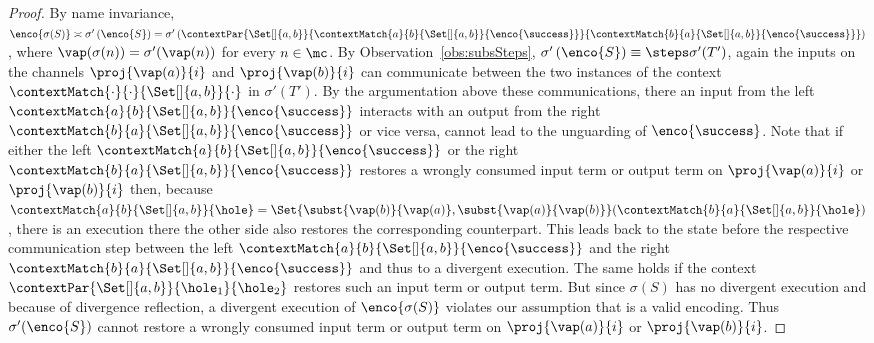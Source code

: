 \documentclass[]{article}
\begin{document}
\begin{proof}
	By name invariance, $ \enco{\sigma\!\left( S \right)} \asymp \sigma'\left( \enco{S} \right) = \sigma'\left( \contextPar{\Set[]{ a, b }}{\contextMatch{a}{b}{\Set[]{ a, b }}{\enco{\success}}}{\contextMatch{b}{a}{\Set[]{ a, b }}{\enco{\success}}} \right) $, where $ \vap\!\left( \sigma\!\left( n \right) \right) = \sigma'\!\left( \vap\!\left( n \right) \right) $ for every $ n \in \mc $.
	By Observation~\ref{obs:subsSteps}, $ \sigma'\left( \enco{S} \right) \equiv\steps \sigma'\!\left( T' \right) $, \ie again the inputs on the channels $ \proj{\vap\!\left( a \right)}{i} $ and $ \proj{\vap\!\left( b \right)}{i} $ can communicate between the two instances of the context $ \contextMatch{\cdot}{\cdot}{\Set[]{ a, b }}{\cdot} $ in $ \sigma'\!\left( T' \right) $.
	By the argumentation above these communications, \ie there an input from the left $ \contextMatch{a}{b}{\Set[]{ a, b }}{\enco{\success}} $ interacts with an output from the right $ \contextMatch{b}{a}{\Set[]{ a, b }}{\enco{\success}} $ or vice versa, cannot lead to the unguarding of $ \enco{\success} $.
	Note that if either the left $ \contextMatch{a}{b}{\Set[]{ a, b }}{\enco{\success}} $ or the right $ \contextMatch{b}{a}{\Set[]{ a, b }}{\enco{\success}} $ restores a wrongly consumed input term or output term on $ \proj{\vap\!\left( a \right)}{i} $ or $ \proj{\vap\!\left( b \right)}{i} $ then, because $ \contextMatch{a}{b}{\Set[]{ a, b }}{\hole} = \Set{ \subst{\vap(b)}{\vap(a)}, \subst{\vap(a)}{\vap(b)} }\!\left( \contextMatch{b}{a}{\Set[]{ a, b }}{\hole} \right) $, there is an execution there the other side also restores the corresponding counterpart. This leads back to the state before the respective communication step between the left $ \contextMatch{a}{b}{\Set[]{ a, b }}{\enco{\success}} $ and the right $ \contextMatch{b}{a}{\Set[]{ a, b }}{\enco{\success}} $ and thus to a divergent execution.
	The same holds if the context $ \contextPar{\Set[]{ a, b }}{\hole_1}{\hole_2} $ restores such an input term or output term.
	But since $ \sigma\!\left( S \right) $ has no divergent execution and because of divergence reflection, a divergent execution of $ \enco{\sigma\!\left( S \right)} $ violates our assumption that \encod is a valid encoding.
	Thus $ \sigma'\!\left( \enco{S} \right) $ cannot restore a wrongly consumed input term or output term on $ \proj{\vap\!\left( a \right)}{i} $ or $ \proj{\vap\!\left( b \right)}{i} $.
	

\end{proof}
\end{document}
